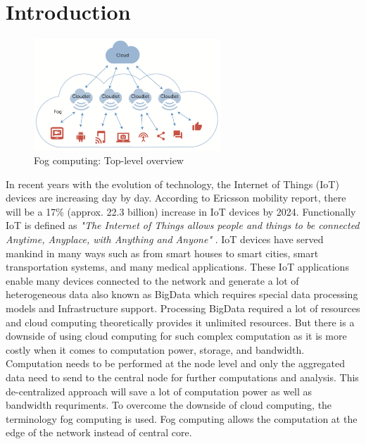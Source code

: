 \section{Introduction}
\label{sec:introduction}
\begin{figure}
  \centering
  \includegraphics[width=70mm]{figures/mlcn-fog-1.pdf}
  \caption{Fog computing: Top-level overview\cite{Bittencourt2017}}
  \label{fig:fog-arch}
\end{figure}
In recent years with the evolution of technology, the Internet of Things (IoT) devices are increasing day by day. According to Ericsson mobility report\cite{}, there will be a 17\% (approx. 22.3 billion) increase in IoT devices by 2024. Functionally IoT is defined as \emph{"The Internet of Things allows people and things to be connected Anytime, Anyplace, with Anything and Anyone"} \cite{European commission 2008}. IoT devices have served mankind in many ways such as from smart houses to smart cities, smart transportation systems, and many medical applications. These IoT applications enable many devices connected to the network and generate a lot of heterogeneous data also known as BigData which requires special data processing models and Infrastructure support. Processing BigData required a lot of resources and cloud computing theoretically provides it unlimited resources\cite{fog-comp-survey}. But there is a downside of using cloud computing for such complex computation as it is more costly when it comes to computation power, storage, and bandwidth. Computation needs to be performed at the node level and only the aggregated data need to send to the central node for further computations and analysis. This de-centralized approach will save a lot of computation power as well as bandwidth requriments\cite{fog-comp-survey}. To overcome the downside of cloud computing, the terminology fog computing is used. Fog computing allows the computation at the edge of the network instead of central core. \par

